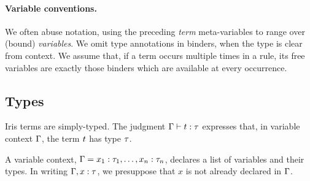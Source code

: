 \paragraph{Variable conventions.}
We often abuse notation, using the preceding \emph{term} meta-variables to range over (bound) \emph{variables}.
We omit type annotations in binders, when the type is clear from context.
We assume that, if a term occurs multiple times in a rule, its free variables are exactly those binders which are available at every occurrence.


\subsection{Types}\label{sec:types}

Iris terms are simply-typed.
The judgment $\Gamma \vdash t : \tau$ expresses that, in variable context $\Gamma$, the term $t$ has type $\tau$.

A variable context, $\Gamma = x_1:\tau_1, \dots, x_n:\tau_n$, declares a list of variables and their types.
In writing $\Gamma, x:\tau$, we presuppose that $x$ is not already declared in $\Gamma$.

